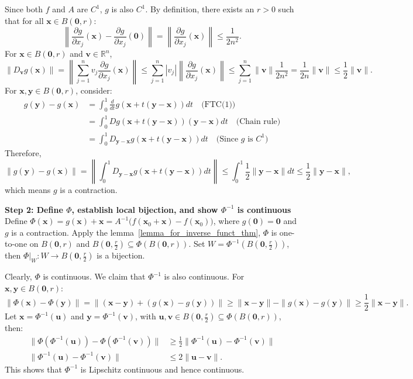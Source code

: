 \begin{pfbox}
Since both $f$ and $A$ are $C^1$, $g$ is also $C^1$. By definition, there exists an $r>0$ such that for all $\mathbf{x}\in B(\mathbf{0},r)$:
$$ \left\|\frac{\partial g}{\partial x_j}(\mathbf{x})-\frac{\partial g}{\partial x_j}(\mathbf{0})\right\| = \left\|\frac{\partial g}{\partial x_j}(\mathbf{x})\right\| \le \frac{1}{2n^2}. $$
For $\mathbf{x}\in B(\mathbf{0},r)$ and $\mathbf{v}\in \mathbb{R}^n$,
$$ \|D_{\mathbf{v}}g(\mathbf{x})\| = \left\|\sum_{j=1}^{n}v_j\frac{\partial g}{\partial x_j}(\mathbf{x})\right\| \le \sum_{j=1}^{n}|v_j|\left\|\frac{\partial g}{\partial x_j}(\mathbf{x})\right\| \le \sum_{j=1}^{n}\|\mathbf{v}\|\frac{1}{2n^2} = \frac{1}{2n}\|\mathbf{v}\| \le \frac{1}{2}\|\mathbf{v}\|. $$
For $\mathbf{x},\mathbf{y}\in B(\mathbf{0},r)$, consider:
\begin{align*}
g(\mathbf{y})-g(\mathbf{x}) &= \int_{0}^{1}\frac{d}{dt}g(\mathbf{x}+t(\mathbf{y}-\mathbf{x}))dt \quad \text{(FTC(1))} \\
&= \int_{0}^{1}Dg(\mathbf{x}+t(\mathbf{y}-\mathbf{x}))(\mathbf{y}-\mathbf{x})dt \quad \text{(Chain rule)} \\
&= \int_{0}^{1}D_{\mathbf{y}-\mathbf{x}}g(\mathbf{x}+t(\mathbf{y}-\mathbf{x}))dt \quad \text{(Since $g$ is $C^1$)}
\end{align*}
Therefore,
$$ \|g(\mathbf{y})-g(\mathbf{x})\| = \left\|\int_{0}^{1}D_{\mathbf{y}-\mathbf{x}}g(\mathbf{x}+t(\mathbf{y}-\mathbf{x}))dt\right\| \le \int_{0}^{1}\frac{1}{2}\|\mathbf{y}-\mathbf{x}\|dt \le \frac{1}{2}\|\mathbf{y}-\mathbf{x}\|, $$
which means $g$ is a contraction.

\vspace{0.8em}
\noindent \textbf{Step 2: Define $\Phi$, establish local bijection, and show $\Phi^{-1}$ is continuous}\\
Define $\Phi(\mathbf{x}) = g(\mathbf{x})+\mathbf{x} = A^{-1}\big(f(\mathbf{x}_0+\mathbf{x})-f(\mathbf{x}_0)\big)$, where $g(\mathbf{0})=\mathbf{0}$ and $g$ is a contraction.
Apply the lemma~\eqref{lemma_for_inverse_funct_thm}, $\Phi$ is one-to-one on $B(\mathbf{0},r)$ and $B(\mathbf{0},\frac{r}{2})\subseteq\Phi(B(\mathbf{0},r))$.
Set $W=\Phi^{-1}(B(\mathbf{0},\frac{r}{2}))$, then $\Phi|_W:W\to B(\mathbf{0},\frac{r}{2})$ is a bijection.

Clearly, $\Phi$ is continuous. We claim that $\Phi^{-1}$ is also continuous. For $\mathbf{x},\mathbf{y}\in B(\mathbf{0},r)$:
$$ \|\Phi(\mathbf{x})-\Phi(\mathbf{y})\| = \|(\mathbf{x}-\mathbf{y})+(g(\mathbf{x})-g(\mathbf{y}))\| \ge \|\mathbf{x}-\mathbf{y}\|-\|g(\mathbf{x})-g(\mathbf{y})\| \ge \frac{1}{2}\|\mathbf{x}-\mathbf{y}\|. $$
Let $\mathbf{x}=\Phi^{-1}(\mathbf{u})$ and $\mathbf{y}=\Phi^{-1}(\mathbf{v})$, with $\mathbf{u},\mathbf{v}\in B(\mathbf{0},\frac{r}{2})\subseteq \Phi(B(\mathbf{0},r))$, then:
\begin{align*}
\|\Phi(\Phi^{-1}(\mathbf{u}))-\Phi(\Phi^{-1}(\mathbf{v}))\| &\ge \frac{1}{2}\|\Phi^{-1}(\mathbf{u})-\Phi^{-1}(\mathbf{v})\| \\
\|\Phi^{-1}(\mathbf{u})-\Phi^{-1}(\mathbf{v})\| &\le 2\|\mathbf{u}-\mathbf{v}\|.
\end{align*}
This shows that $\Phi^{-1}$ is Lipschitz continuous and hence continuous.


\end{pfbox}
